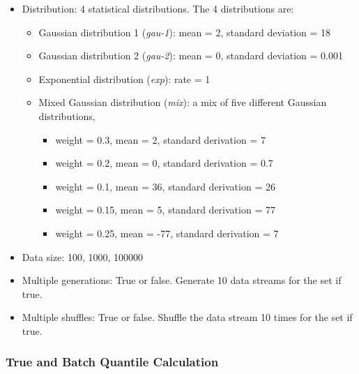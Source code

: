 \begin{itemize}
    \item Distribution: 4 statistical distributions. The 4 distributions are:
        \begin{itemize}
            \item Gaussian distribution 1 (\textit{gau-1}): mean = 2, standard deviation = 18
            \item Gaussian distribution 2 (\textit{gau-2}): mean = 0, standard deviation = 0.001
            \item Exponential distribution (\textit{exp}): rate = 1
            \item Mixed Gaussian distribution (\textit{mix}): a mix of five different Gaussian distributions, 
            \begin{itemize}
                \item weight = 0.3, mean = 2, standard derivation = 7
                \item weight = 0.2, mean = 0, standard derivation = 0.7
                \item weight = 0.1, mean = 36, standard derivation = 26
                \item weight = 0.15, mean = 5, standard derivation = 77
                \item weight = 0.25, mean = -77, standard derivation = 7
            \end{itemize}
        \end{itemize}
    \item Data size: 100, 1000, 100000
    \item Multiple generations: True or false. Generate 10 data streams for the set if true.
    \item Multiple shuffles:  True or false. Shuffle the data stream 10 times for the set if true.
\end{itemize}


\subsubsection{True and Batch Quantile Calculation}

